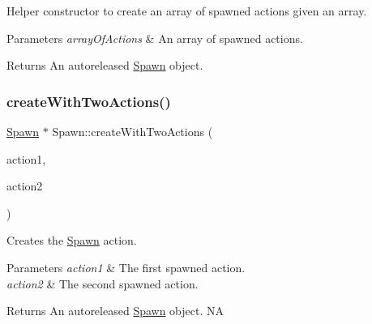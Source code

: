 Helper constructor to create an array of spawned actions given an array.


\begin{DoxyParams}{Parameters}
{\em array\+Of\+Actions} & An array of spawned actions. \\
\hline
\end{DoxyParams}
\begin{DoxyReturn}{Returns}
An autoreleased \hyperlink{classSpawn}{Spawn} object. 
\end{DoxyReturn}
\mbox{\label{classSpawn_aa65c571082a34ba56a00a30803538d47}} 
\subsubsection{\texorpdfstring{create\+With\+Two\+Actions()}{createWithTwoActions()}\hspace{0.1cm}{\footnotesize\ttfamily [1/2]}}
{\footnotesize\ttfamily \hyperlink{classSpawn}{Spawn} $\ast$ Spawn\+::create\+With\+Two\+Actions (\begin{DoxyParamCaption}\item[{\hyperlink{classFiniteTimeAction}{Finite\+Time\+Action} $\ast$}]{action1,  }\item[{\hyperlink{classFiniteTimeAction}{Finite\+Time\+Action} $\ast$}]{action2 }\end{DoxyParamCaption})\hspace{0.3cm}{\ttfamily [static]}}

Creates the \hyperlink{classSpawn}{Spawn} action.


\begin{DoxyParams}{Parameters}
{\em action1} & The first spawned action. \\
\hline
{\em action2} & The second spawned action. \\
\hline
\end{DoxyParams}
\begin{DoxyReturn}{Returns}
An autoreleased \hyperlink{classSpawn}{Spawn} object.  NA 
\end{DoxyReturn}
\mbox{\label{classSpawn_afaeb8f2e971a3dec7f65d3a635598bb1}} 
